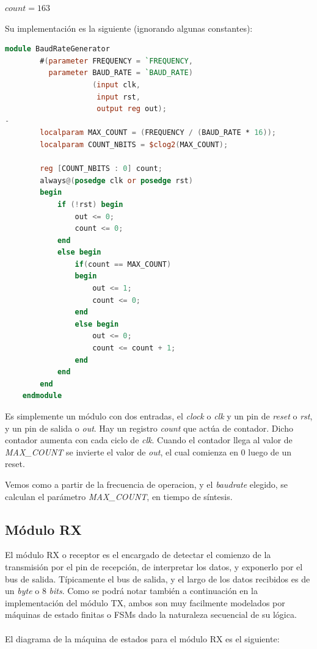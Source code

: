 \documentclass{article}
\begin{document}
\begin{center}
    $ count = 163 $
\end{center}

Su implementación es la siguiente (ignorando algunas constantes):

\begin{lstlisting}[language=Verilog]
    module BaudRateGenerator
        #(parameter FREQUENCY = `FREQUENCY,
          parameter BAUD_RATE = `BAUD_RATE)
                    (input clk,
                     input rst,
                     output reg out);
-
        localparam MAX_COUNT = (FREQUENCY / (BAUD_RATE * 16));
        localparam COUNT_NBITS = $clog2(MAX_COUNT);

        reg [COUNT_NBITS : 0] count;
        always@(posedge clk or posedge rst)
        begin
            if (!rst) begin
                out <= 0;
                count <= 0;
            end
            else begin
                if(count == MAX_COUNT)
                begin
                    out <= 1;
                    count <= 0;
                end
                else begin
                    out <= 0;
                    count <= count + 1;
                end
            end
        end
    endmodule
\end{lstlisting}

Es simplemente un módulo con dos entradas, el \textit{clock} o \textit{clk} y un pin de \textit{reset} o \textit{rst}, y
un pin de salida o \textit{out}.
Hay un registro \textit{count} que actúa de contador. Dicho contador aumenta con cada ciclo de \textit{clk}.
Cuando el contador llega al valor de \textit{MAX\_COUNT} se invierte el valor de \textit{out}, el cual comienza en 0
luego de un reset.

Vemos como a partir de la frecuencia de operacion, y el \textit{baudrate} elegido,
se calculan el parámetro \textit{MAX\_COUNT}, en tiempo de síntesis.

\subsection{Módulo RX}
\indent El módulo RX o receptor es el encargado de detectar el comienzo de la transmisión por el pin de recepción,
de interpretar los datos, y exponerlo por el bus de salida. Típicamente el bus de salida, y el largo de los datos recibidos
es de un \textit{byte} o 8 \textit{bits}.
\indent Como se podrá notar también a continuación en la implementación del módulo TX, ambos son muy facilmente modelados por máquinas de estado finitas o FSMs dado la naturaleza secuencial de su lógica.
\\
\\
El diagrama de la máquina de estados para el módulo RX es el siguiente:
\end{document}
